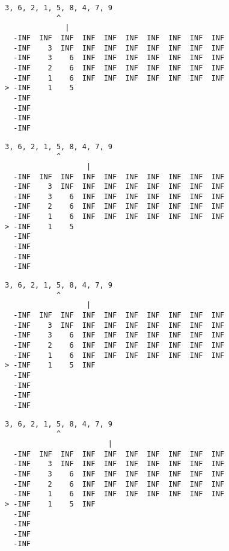 { \begin{verbatim}
3, 6, 2, 1, 5, 8, 4, 7, 9
            ^
              |
  -INF  INF  INF  INF  INF  INF  INF  INF  INF  INF
  -INF    3  INF  INF  INF  INF  INF  INF  INF  INF
  -INF    3    6  INF  INF  INF  INF  INF  INF  INF
  -INF    2    6  INF  INF  INF  INF  INF  INF  INF
  -INF    1    6  INF  INF  INF  INF  INF  INF  INF
> -INF    1    5                                   
  -INF                                             
  -INF                                             
  -INF                                             
  -INF                                             
\end{verbatim} }

{ \begin{verbatim}
3, 6, 2, 1, 5, 8, 4, 7, 9
            ^
                   |
  -INF  INF  INF  INF  INF  INF  INF  INF  INF  INF
  -INF    3  INF  INF  INF  INF  INF  INF  INF  INF
  -INF    3    6  INF  INF  INF  INF  INF  INF  INF
  -INF    2    6  INF  INF  INF  INF  INF  INF  INF
  -INF    1    6  INF  INF  INF  INF  INF  INF  INF
> -INF    1    5                                   
  -INF                                             
  -INF                                             
  -INF                                             
  -INF                                             
\end{verbatim} }

{ \begin{verbatim}
3, 6, 2, 1, 5, 8, 4, 7, 9
            ^
                   |
  -INF  INF  INF  INF  INF  INF  INF  INF  INF  INF
  -INF    3  INF  INF  INF  INF  INF  INF  INF  INF
  -INF    3    6  INF  INF  INF  INF  INF  INF  INF
  -INF    2    6  INF  INF  INF  INF  INF  INF  INF
  -INF    1    6  INF  INF  INF  INF  INF  INF  INF
> -INF    1    5  INF                              
  -INF                                             
  -INF                                             
  -INF                                             
  -INF                                             
\end{verbatim} }

{ \begin{verbatim}
3, 6, 2, 1, 5, 8, 4, 7, 9
            ^
                        |
  -INF  INF  INF  INF  INF  INF  INF  INF  INF  INF
  -INF    3  INF  INF  INF  INF  INF  INF  INF  INF
  -INF    3    6  INF  INF  INF  INF  INF  INF  INF
  -INF    2    6  INF  INF  INF  INF  INF  INF  INF
  -INF    1    6  INF  INF  INF  INF  INF  INF  INF
> -INF    1    5  INF                              
  -INF                                             
  -INF                                             
  -INF                                             
  -INF                                             
\end{verbatim} }

